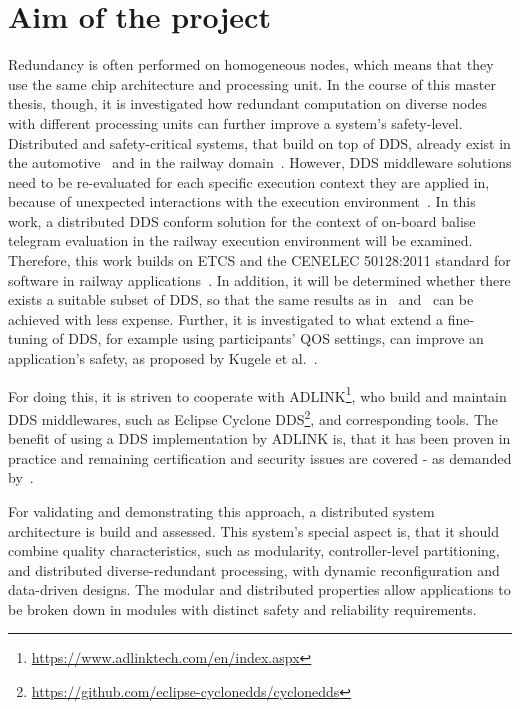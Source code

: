 \documentclass[a4paper, 12pt]{scrartcl}
\begin{document}
\section*{Aim of the project}
Redundancy is often performed on homogeneous nodes, which means that they use the same chip architecture and processing unit.
In the course of this master thesis, though, it is investigated how redundant computation on diverse nodes with different processing units can further improve a system's safety-level.
Distributed and safety-critical systems, that build on top of \ac{DDS}, already exist in the automotive~\cite{DistributedSafety2020} and in the railway domain~\cite{DDSInURail}.
However, \ac{DDS} middleware solutions need to be re-evaluated for each specific execution context they are applied in, because of unexpected interactions with the execution environment~\cite{CotroneoDDSFailureAnalysis}.
In this work, a distributed \ac{DDS} conform solution for the context of on-board balise telegram evaluation in the railway execution environment will be examined.
Therefore, this work builds on \ac{ETCS} and the CENELEC 50128:2011 standard for software in railway applications~\cite{BoulangerStandards}.
In addition, it will be determined whether there exists a suitable subset of \ac{DDS}, so that the same results as in~\cite{DistributedSafety2020} and~\cite{KugeleDataCentricForAuto} can be achieved with less expense.
Further, it is investigated to what extend a fine-tuning of \ac{DDS}, for example using participants' \ac{QOS} settings, can improve an application's safety, as proposed by Kugele et al.~\cite{KugeleDataCentricForAuto}.

For doing this, it is striven to cooperate with ADLINK\footnote{\url{https://www.adlinktech.com/en/index.aspx}}, who build and maintain \ac{DDS} middlewares, such as Eclipse Cyclone DDS\footnote{\url{https://github.com/eclipse-cyclonedds/cyclonedds}}, and corresponding tools.
The benefit of using a \ac{DDS} implementation by ADLINK is, that it has been proven in practice and remaining certification and security issues are covered - as demanded by~\cite{KugeleDataCentricForAuto}.

For validating and demonstrating this approach, a distributed system architecture is build and assessed.
This system's special aspect is, that it should combine quality characteristics, such as modularity, control\-ler-level partitioning, and distributed diverse-redundant processing, with dynamic reconfiguration and data-driven designs.
The modular and distributed properties allow applications to be broken down in modules with distinct safety and reliability requirements.
\end{document}
